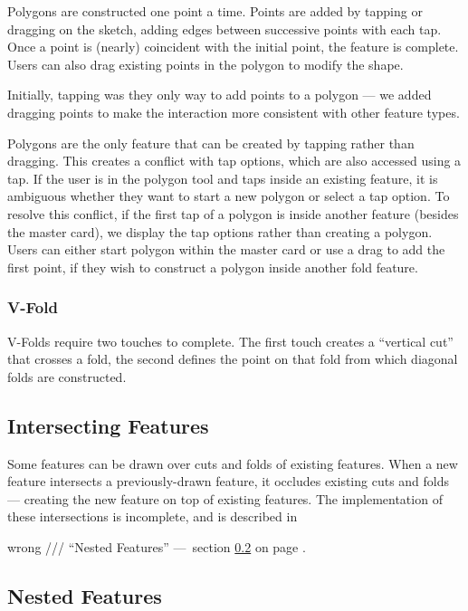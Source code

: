 Polygons are constructed one point a time. Points are added by tapping
or dragging on the sketch, adding edges between successive points with
each tap. Once a point is (nearly) coincident with the initial point,
the feature is complete. Users can also drag existing points in the
polygon to modify the shape.

Initially, tapping was they only way to add points to a polygon --- we
added dragging points to make the interaction more consistent with other
feature types.

Polygons are the only feature that can be created by tapping rather than
dragging. This creates a conflict with tap options, which are also
accessed using a tap. If the user is in the polygon tool and taps inside
an existing feature, it is ambiguous whether they want to start a new
polygon or select a tap option. To resolve this conflict, if the first
tap of a polygon is inside another feature (besides the master card), we
display the tap options rather than creating a polygon. Users can either
start polygon within the master card or use a drag to add the first
point, if they wish to construct a polygon inside another fold feature.

\subsubsection{V-Fold}\label{v-fold}

V-Folds require two touches to complete. The first touch creates a
``vertical cut'' that crosses a fold, the second defines the point on
that fold from which diagonal folds are constructed.

\subsection{Intersecting Features}\label{intersecting-features}

Some features can be drawn over cuts and folds of existing features.
When a new feature intersects a previously-drawn feature, it occludes
existing cuts and folds --- creating the new feature on top of existing
features. The implementation of these intersections is incomplete, and
is described in

wrong /// ``Nested Features'' ---~section \ref{nested-features} on page
\pageref{nested-features}.

\subsection{Nested Features}\label{nested-features}

